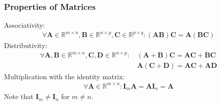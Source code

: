 \documentclass{article}
\begin{document}
	\subsubsection{Properties of Matrices}
	Associativity:
	\begin{align}
		\forall \textbf{A} \in \mathbb{R}^{m \times n}, \textbf{B} \in \mathbb{R}^{n \times p}, \textbf{C} \in \mathbb{R}^{p \times q}: (\textbf{AB})\textbf{C} = \textbf{A}(\textbf{BC})
	\end{align}
	Distributivity: 
	\begin{align}
		\forall \textbf{A}, \textbf{B} \in \mathbb{R}^{m \times n}, \textbf{C}, \textbf{D} \in \mathbb{R}^{n \times p}:\hspace{2pt} & (\textbf{A} + \textbf{B})\textbf{C} = \textbf{AC} + \textbf{BC} \\ & \textbf{A}(\textbf{C} + \textbf{D}) = \textbf{AC} + \textbf{AD}
	\end{align}
	Multiplication with the identity matrix:
	\begin{align}
		\forall \textbf{A} \in \mathbb{R}^{m \times n}: \textbf{I}_m\textbf{A} = \textbf{AI}_n = \textbf{A}
 	\end{align}
 	Note that $\textbf{I}_m \ne \textbf{I}_n$ for $m \ne n$.
\end{document}

